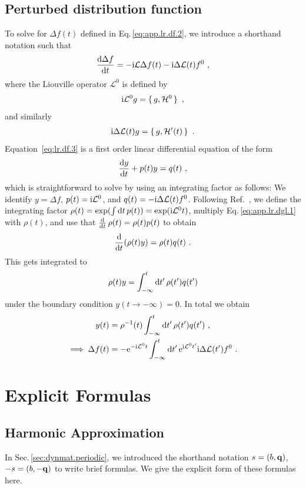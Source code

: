 \section{Perturbed distribution function}
\label{app:lr.f}
To solve for $\Delta f(t)$ defined in Eq.\,\eqref{eq:app.lr.df.2}, we introduce a shorthand notation such that
%
\begin{align}
  \frac{\d \Delta f}{\d t} = -\im \mathcal L \Delta f(t) - \im \Delta \mathcal L (t) f^0~,
  \label{eq:lr.df.3}
\end{align}
where the Liouville operator $\mathcal L^0$ is defined by
%
\begin{align}
	\im \mathcal  L^0 g = \set{g, \mathcal H^0}~,
	\label{eq:app.lr.L}
\end{align}
%
and similarly
\begin{align}
	\im \Delta \mathcal L (t) g = \set{g, \mathcal H'(t)}~.
	\label{eq:app.lr.L'}
\end{align}
Equation~\eqref{eq:lr.df.3} is a first order linear differential equation of the form
\begin{align}
	\frac{\d y}{\d t} + p(t) y = q(t)~,
	\label{eq:app.lr.dgl.1}
\end{align}
which is straightforward to solve by using an integrating factor as follows: We identify $y = \Delta f$, $p(t) = {\rm i} \mathcal L^0$, and $q(t) = - {\rm i} \Delta \mathcal L (t) f^0$. Following Ref.~\cite[p.\,68]{Lomen1986}, we define the integrating factor \mbox{$\rho (t) = \exp(\int {\rm d} t \, p (t)) = \exp ({\rm i} \mathcal L^0 t)$}, multiply Eq.\,\eqref{eq:app.lr.dgl.1} with $\rho (t)$, and use that \mbox{$\frac{{\rm d}}{{\rm d} t} \, \rho(t) = \rho(t) p(t)$} to obtain
$$
  \frac{{\rm d}}{{\rm d} t} (\rho (t) y) = \rho(t) q(t)~.
$$
This gets integrated to
$$
\rho(t) y = \int_{-\infty}^t {\rm d} t' \, \rho(t') q(t')
$$
under the boundary condition $y (t \to -\infty) = 0$. In total we obtain
%
\begin{align}
  y(t) 
    &= \rho^{-1} (t) \int_{-\infty}^t {\rm d} t' \, \rho(t') q(t')~, \\
  \implies
  \Delta f(t) 
    &= - {\rm e}^{- {\rm i} \mathcal L^0 t}  \int_{-\infty}^t {\rm d} t' \, {\rm e}^{{\rm i} \mathcal L^0 t'} {\rm i} \Delta \mathcal L (t') f^0~.
\end{align}

\chapter{Explicit Formulas}
\section{Harmonic Approximation}
\label{app:formulas.ha}
In Sec.\,\ref{sec:dynmat.periodic}, we introduced the shorthand notation $s=(b, {\bf q})$, $-s=(b, -{\bf q})$ to write brief formulas. We give the explicit form of these formulas here.

